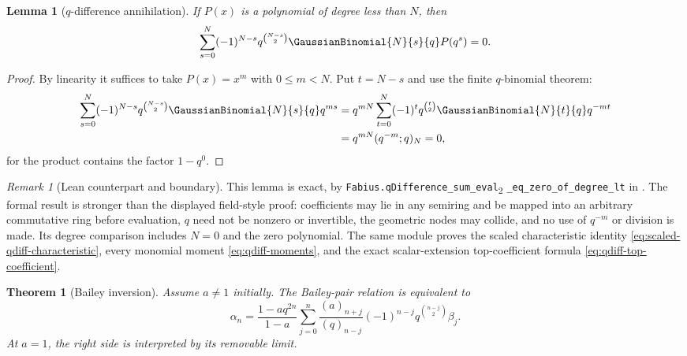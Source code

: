 \documentclass[11pt,a4paper,oneside,openany]{book}
\newtheorem{theorem}{Theorem}[chapter]
\newtheorem{lemma}[lemma]{Lemma}
\theoremstyle{definition}
\theoremstyle{remark}
\newtheorem{remark}[remark]{Remark}
\newcommand{\statusexact}{\textsf{\color{statusgreen}exact}}
\begin{document}
\begin{lemma}[$q$-difference annihilation]\label{lem:qdiff-annihilation}
If $P(x)$ is a polynomial of degree less than $N$, then
\[
 \sum_{s=0}^{N}(-1)^{N-s}q^{\binom{N-s}{2}}
 \GaussianBinomial{N}{s}{q} P(q^s)=0.
\]
\end{lemma}

\begin{proof}
By linearity it suffices to take $P(x)=x^m$ with $0\le m<N$.  Put $t=N-s$ and use the finite $q$-binomial theorem:
\begin{align*}
 \sum_{s=0}^{N}(-1)^{N-s}q^{\binom{N-s}{2}}\GaussianBinomial{N}{s}{q} q^{ms}
 &=q^{mN}\sum_{t=0}^{N}(-1)^tq^{\binom t2}\GaussianBinomial{N}{t}{q}q^{-mt}\\
 &=q^{mN}(q^{-m};q)_N=0,
\end{align*}
for the product contains the factor $1-q^0$.
\end{proof}

\begin{remark}[Lean counterpart and boundary]
This lemma is \statusexact, by
\texttt{Fabius.qDifference\_\allowbreak{}sum\_\allowbreak{}eval}\textsubscript{2}\allowbreak
\texttt{\_\allowbreak{}eq\_\allowbreak{}zero\_\allowbreak{}of\_\allowbreak{}degree\_\allowbreak{}lt} in
.  The formal result is stronger than the
displayed field-style proof: coefficients may lie in any semiring and be
mapped into an arbitrary commutative ring before evaluation, \(q\) need not
be nonzero or invertible, the geometric nodes may collide, and no use of
\(q^{-m}\) or division is made.  Its degree comparison includes \(N=0\) and
the zero polynomial.  The same module proves the scaled characteristic
identity \eqref{eq:scaled-qdiff-characteristic}, every monomial moment
\eqref{eq:qdiff-moments}, and the exact scalar-extension top-coefficient
formula \eqref{eq:qdiff-top-coefficient}.
\end{remark}

\begin{theorem}[Bailey inversion]\label{thm:bailey-inversion}
Assume $a\ne1$ initially.  The Bailey-pair relation is equivalent to
\[
 \alpha_n=\frac{1-aq^{2n}}{1-a}
 \sum_{j=0}^{n}
 \frac{(a)_{n+j}}{(q)_{n-j}}
 (-1)^{n-j}q^{\binom{n-j}{2}}\beta_j.
\]
At $a=1$, the right side is interpreted by its removable limit.
\end{theorem}
\end{document}
